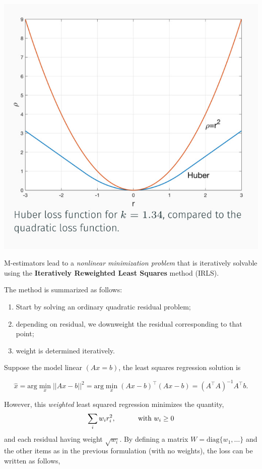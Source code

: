 \documentclass[10pt]{report}
\begin{document}
\begin{center}
\includegraphics[scale=0.32]{./pics/fit/m-estimators-huber.jpg}
\end{center}

M-estimators lead to a \emph{nonlinear minimization problem} that is
iteratively solvable using the \textbf{Iteratively Reweighted Least Squares}
method (IRLS).

The method is summarized as follows:

\begin{enumerate}
\item Start by solving an ordinary quadratic residual problem;
\item depending on residual, we downweight the residual corresponding to
that point;
\item weight is determined iteratively.
\end{enumerate}

Suppose the model linear \((Ax = b)\), the least squares regression
solution is

\[\hat{x} = \mbox{arg} \min_x ||Ax - b||^2 = \mbox{arg} \min_x (Ax - b)^\top (Ax - b) = (A^\top A)^{-1}A^\top b.\]

However, this \emph{weighted} least squared regression minimizes the
quantity, \[\sum_i w_i r_i^2,\hspace*{1cm} \mbox{ with } w_i \geq 0\] and each residual
having weight \(\sqrt{w_i}\). By defining a matrix
\(W = \mbox{diag}\{w_1, \dots\}\) and the other items as in the previous
formulation (with no weights), the loss can be written as follows,
\end{document}
